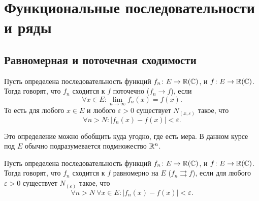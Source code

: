 \documentclass[11pt,dvipsnames]{report}
\begin{document}

\chapter{Функциональные последовательности и ряды}
\section{Равномерная и поточечная сходимости}

\begin{defn}
	Пусть определена последовательность функций $ f_n\colon E \to \mathbb{R} (\mathbb{C})$, и $ f\colon E \to \mathbb{R}(\mathbb{C})$. Тогда говорят, что {\sf $ f_n$ сходится к  $ f$ поточечно} ($ f_n \to  f$), если 
	\[
		\forall x \in E\colon \lim_{n \to \infty} f_n (x) = f(x)
	.\] 
	То есть для любого  $ x \in E$ и любого $ \varepsilon >0$ существует $ N_{(x, \varepsilon )}$ такое, что
	\[
		\forall n > N\colon \lvert f_n(x) - f(x) \rvert < \varepsilon 
	.\] 
\end{defn}
\begin{note}
    Это определение можно обобщить куда угодно, где есть мера.
	В данном курсе под $ E$ обычно подразумевается подмножество $ \mathbb{R}^{n}$.
\end{note}

\begin{defn}
	Пусть определена последовательность функций $ f_n\colon E \to \mathbb{R} (\mathbb{C})$, и $ f\colon E \to \mathbb{R}(\mathbb{C})$. Тогда говорят, что {\sf $ f_n$ сходится к  $ f$ равномерно на $ E$} ($ f_n \rightrightarrows  f$), если 
	для любого $ \varepsilon >0$ существует $ N_{(\varepsilon )}$ такое, что 
	\[
		\forall n > N ~ \forall x \in E \colon \lvert f_n(x) - f(x)  \rvert < \varepsilon 
	.\] 
\end{defn}
\end{document}
